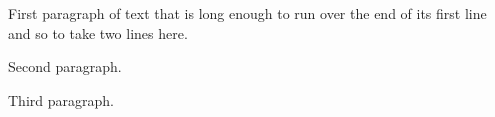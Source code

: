 \documentclass[12pt]{article}
\begin{document}
First paragraph of text that is long enough to run over the end of its first line and so to take two lines here.

Second paragraph.

Third paragraph.
\end{document}
